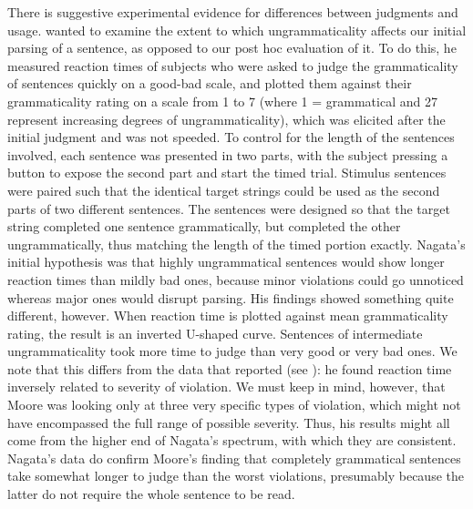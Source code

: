 There is suggestive experimental evidence for differences between judgments and usage. \citet{Nagata1990a} wanted to examine the extent to which ungrammaticality affects our initial parsing of a sentence, as opposed to our post hoc evaluation of it. To do this, he measured reaction times of subjects who were asked to judge the grammaticality of sentences quickly on a good-bad scale, and plotted them against their grammaticality rating on a scale from 1 to 7 (where 1 = grammatical and 2\textendash{}7 represent increasing degrees of ungrammaticality), which was elicited after the initial judgment and was not speeded. To control for the length of the sentences involved, each sentence was presented in two parts, with the subject pressing a button to expose the second part and start the timed trial. Stimulus sentences were paired such that the identical target strings could be used as the second parts of two different sentences. The sentences were designed so that the target string completed one sentence grammatically, but completed the other ungrammatically, thus matching the length of the timed portion exactly. Nagata's initial hypothesis was that highly ungrammatical sentences would show longer reaction times than mildly bad ones, because minor violations could go unnoticed whereas major ones would disrupt parsing. His findings showed something quite different, however. When reaction time is plotted against mean grammaticality rating, the result is an inverted U-shaped curve. Sentences of intermediate ungrammaticality took more time to judge than very good or very bad ones. We note that this differs
from the data that \citet{Moore1972} reported (see ): he found reaction time inversely related to severity of violation. We must keep in mind, however, that Moore was looking only at three very specific types of violation, which might not have encompassed the full range of possible severity. Thus, his results might all come from the higher end of Nagata's spectrum, with which they are consistent. Nagata's data do confirm Moore's finding that completely grammatical sentences take somewhat longer to judge than the worst violations, presumably because the latter do not require the whole sentence to be read.

